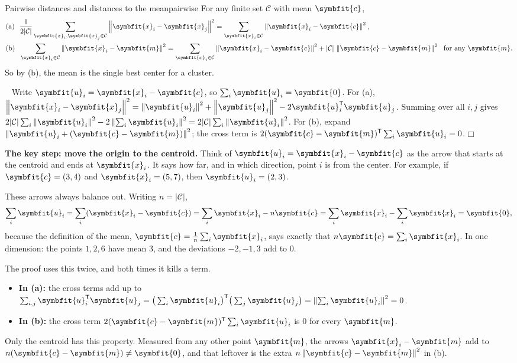 \documentclass[11pt]{article}
\newcommand{\bm}[1]{\symbfit{#1}}
\newenvironment{proofsketch}{\par\noindent{\itshape Proof.}\ }{\hfill$\mdlgwhtsquare$\par}
\newcommand{\vx}{\bm{x}}
\newcommand{\T}{^{\mathsf T}}
\newcommand{\norm}[1]{\left\lVert #1\right\rVert}
\begin{document}
\begin{proposition}{Pairwise distances and distances to the mean}{pairwise}
For any finite set $\mathcal C$ with mean $\bm c$,
\[
\begin{aligned}
&\text{(a)}\ \ \frac1{2|\mathcal C|}\sum_{\vx_i,\vx_j\in\mathcal C}\norm{\vx_i-\vx_j}^2=\sum_{\vx_i\in\mathcal C}\norm{\vx_i-\bm c}^2,\\
&\text{(b)}\ \ \sum_{\vx_i\in\mathcal C}\norm{\vx_i-\bm m}^2=\sum_{\vx_i\in\mathcal C}\norm{\vx_i-\bm c}^2+|\mathcal C|\,\norm{\bm c-\bm m}^2\ \text{ for any }\bm m .
\end{aligned}
\]
So by (b), the mean is the single best center for a cluster.
\end{proposition}
\begin{proofsketch}
Write $\bm u_i=\vx_i-\bm c$, so $\sum_i\bm u_i=\bm0$. For (a), $\norm{\vx_i-\vx_j}^2=\norm{\bm u_i}^2+\norm{\bm u_j}^2-2\bm u_i\T\bm u_j$. Summing over all $i,j$ gives $2|\mathcal C|\sum_i\norm{\bm u_i}^2-2\norm{\sum_i\bm u_i}^2=2|\mathcal C|\sum_i\norm{\bm u_i}^2$. For (b), expand $\norm{\bm u_i+(\bm c-\bm m)}^2$; the cross term is $2(\bm c-\bm m)\T\sum_i\bm u_i=0$.
\end{proofsketch}

\begin{intuition}
\textbf{The key step: move the origin to the centroid.} Think of $\bm u_i=\vx_i-\bm c$ as the arrow that starts at the centroid and ends at $\vx_i$. It says how far, and in which direction, point $i$ is from the center. For example, if $\bm c=(3,4)$ and $\vx_i=(5,7)$, then $\bm u_i=(2,3)$.

These arrows always balance out. Writing $n=|\mathcal C|$,
\[
\sum_i\bm u_i=\sum_i(\vx_i-\bm c)=\sum_i\vx_i-n\bm c=\sum_i\vx_i-\sum_i\vx_i=\bm0,
\]
because the definition of the mean, $\bm c=\frac1n\sum_i\vx_i$, says exactly that $n\bm c=\sum_i\vx_i$. In one dimension: the points $1,2,6$ have mean $3$, and the deviations $-2,-1,3$ add to $0$.

The proof uses this twice, and both times it kills a term.
\begin{itemize}
\item \textbf{In (a):} the cross terms add up to $\sum_{i,j}\bm u_i\T\bm u_j=\big(\sum_i\bm u_i\big)\T\big(\sum_j\bm u_j\big)=\norm{\textstyle\sum_i\bm u_i}^2=0$.
\item \textbf{In (b):} the cross term $2(\bm c-\bm m)\T\sum_i\bm u_i$ is $0$ for every $\bm m$.
\end{itemize}
Only the centroid has this property. Measured from any other point $\bm m$, the arrows $\vx_i-\bm m$ add to $n(\bm c-\bm m)\neq\bm0$, and that leftover is the extra $n\norm{\bm c-\bm m}^2$ in (b).
\end{intuition}
\end{document}
